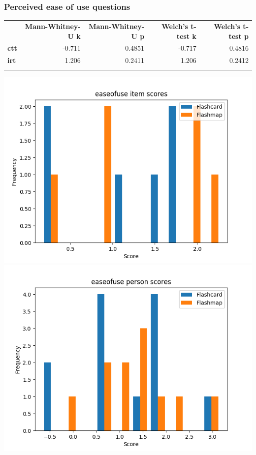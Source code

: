 \documentclass[]{article}
\begin{document}
\subsubsection{Perceived ease of use
questions}\label{perceived-ease-of-use-questions}

\begin{longtable}[c]{@{}lrrrr@{}}
\toprule\addlinespace
& \textbf{Mann-Whitney-U k} & \textbf{Mann-Whitney-U p} &
\textbf{Welch's t-test k} & \textbf{Welch's t-test p}
\\\addlinespace
\midrule\endhead
\textbf{ctt} & -0.711 & 0.4851 & -0.717 & 0.4816
\\\addlinespace
\textbf{irt} & 1.206 & 0.2411 & 1.206 & 0.2412
\\\addlinespace
\bottomrule
\end{longtable}

\includegraphics{easeofuse_diff.png}
\includegraphics{easeofuse_abil.png}
\end{document}

